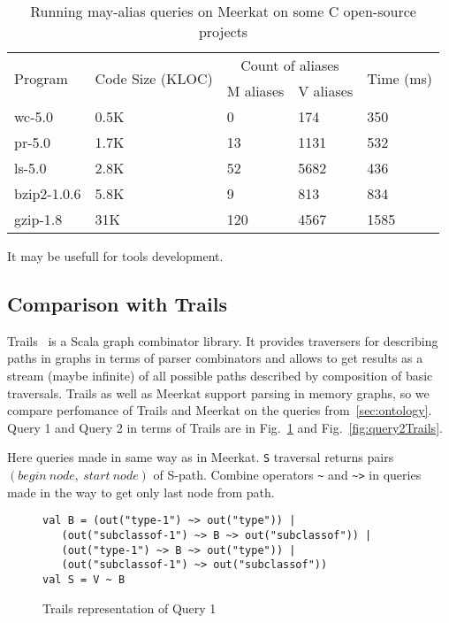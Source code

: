 \begin{table}[t]
\centering
\begin{tabular}{|l|l|ll|l|}
\hline
\multirow{2}{*}{Program} & \multirow{2}{*}{Code Size (KLOC)} & \multicolumn{2}{c|}{Count of aliases} & \multirow{2}{*}{Time (ms)} \\ \cline{3-4}
 &  & \multicolumn{1}{c|}{M aliases} & \multicolumn{1}{c|}{V aliases} &  \\ 
\hline
\hline
wc-5.0      & 0.5K & 0   & 174  & 350 \\
pr-5.0      & 1.7K & 13  & 1131 & 532 \\
ls-5.0      & 2.8K & 52  & 5682 & 436 \\
bzip2-1.0.6 & 5.8K & 9   & 813  & 834 \\
gzip-1.8    & 31K  & 120 & 4567 & 1585\\
\hline
\end{tabular}
\caption{Running may-alias queries on Meerkat on some C open-source projects}
\label{table:staticAnalysis}
\end{table}

It may be usefull for tools development.

\subsection{Comparison with Trails}

Trails~\cite{ScalaGraphParsing} is a Scala graph combinator library.
It provides traversers for describing paths in graphs in terms of parser combinators and allows to get results as a stream (maybe infinite) of all possible paths described by composition of basic traversals.
Trails as well as Meerkat support parsing in memory graphs, so we compare perfomance of Trails and Meerkat on the queries from~\autoref{sec:ontology}.
Query 1 and Query 2 in terms of Trails are in Fig.~\ref{fig:query1Trails} and Fig.~\ref{fig:query2Trails}.

Here queries made in same way as in Meerkat.
\lstinline{S} traversal returns pairs $(begin\ node,\ start\ node)$ of S-path.
Combine operators \lstinline{~} and \lstinline{~>} in queries made in the way to get only last node from path.


\begin{figure}[h]
\begin{lstlisting}
val B = (out("type-1") ~> out("type")) |
   (out("subclassof-1") ~> B ~> out("subclassof")) |
   (out("type-1") ~> B ~> out("type")) |
   (out("subclassof-1") ~> out("subclassof"))
val S = V ~ B
\end{lstlisting}
\caption{Trails representation of Query 1}
\label{fig:query1Trails}
\end{figure}

